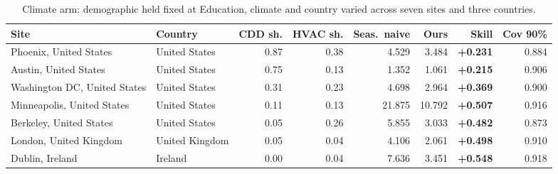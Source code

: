\begin{table}[t]
\centering
\scriptsize
\setlength{\tabcolsep}{3pt}
\begin{tabular}{llrrrrrr}
\toprule
Site & Country & CDD sh. & HVAC sh. & Seas.\ naive & Ours & Skill & Cov 90\% \\
\midrule
Phoenix, United States & United States & 0.87 & 0.38 & 4.529 & 3.484 & \textbf{+0.231} & 0.884 \\
Austin, United States & United States & 0.75 & 0.13 & 1.352 & 1.061 & \textbf{+0.215} & 0.906 \\
Washington DC, United States & United States & 0.31 & 0.23 & 4.698 & 2.964 & \textbf{+0.369} & 0.900 \\
Minneapolis, United States & United States & 0.11 & 0.13 & 21.875 & 10.792 & \textbf{+0.507} & 0.916 \\
Berkeley, United States & United States & 0.05 & 0.26 & 5.855 & 3.033 & \textbf{+0.482} & 0.873 \\
London, United Kingdom & United Kingdom & 0.05 & 0.04 & 4.106 & 2.061 & \textbf{+0.498} & 0.910 \\
Dublin, Ireland & Ireland & 0.00 & 0.04 & 7.636 & 3.451 & \textbf{+0.548} & 0.918 \\
\bottomrule
\end{tabular}
\caption{Climate arm: demographic held fixed at Education, climate and country varied across seven sites and three countries.}
\label{tab:climate}
\end{table}
